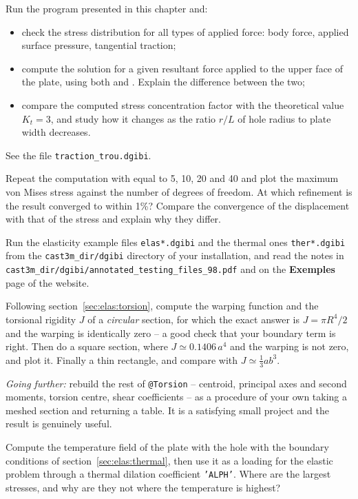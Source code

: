 
 Run the program
  presented in this chapter and:
  \begin{itemize}
  \item check the stress distribution for all types of applied force: body
    force, applied surface pressure, tangential traction;
  \item compute the solution for a given resultant force applied to the upper
    face of the plate, using both  and . Explain
    the difference between the two;
  \item compare the computed stress concentration factor with the
    theoretical value $K_t=3$, and study how it changes as the ratio
    $r/L$ of hole radius to plate width decreases.
  \end{itemize}
  See the file \texttt{traction\_trou.dgibi}.

 Repeat the computation with  equal to
  5, 10, 20 and 40 and plot the maximum von Mises stress against the number of
  degrees of freedom. At which refinement is the result converged to within
  1\%? Compare the convergence of the displacement with that of the stress and
  explain why they differ.

 Run the elasticity example
  files \texttt{elas*.dgibi} and the thermal ones \texttt{ther*.dgibi} from
  the \texttt{cast3m\_dir/dgibi} directory of your installation, and read the
  notes in \texttt{cast3m\_dir/dgibi/annotated\_testing\_files\_98.pdf} and
  on the \textbf{Exemples} page of the website.

 Following
  section~\ref{sec:elas:torsion}, compute the warping function and the
  torsional rigidity $J$ of a \emph{circular} section, for which the exact
  answer is $J=\pi R^{4}/2$ and the warping is identically zero -- a good
  check that your boundary term is right. Then do a square section, where
  $J \simeq 0.1406\,a^{4}$ and the warping is not zero, and plot it. Finally
  a thin rectangle, and compare with $J\simeq\frac{1}{3}ab^{3}$.

  \emph{Going further:} rebuild the rest of \texttt{@Torsion} -- centroid,
  principal axes and second moments, torsion centre, shear coefficients --
  as a procedure of your own taking a meshed section and returning a table.
  It is a satisfying small project and the result is genuinely useful.

 Compute the temperature field of the
  plate with the hole with the boundary conditions of
  section~\ref{sec:elas:thermal}, then use it as a loading for the elastic
  problem through a thermal dilation coefficient \texttt{'ALPH'}. Where are
  the largest stresses, and why are they not where the temperature is
  highest?
